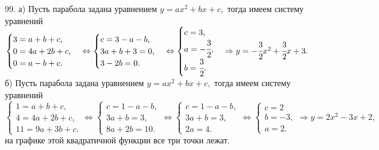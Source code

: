 99. а) Пусть парабола задана уравнением $y=ax^2+bx+c,$ тогда имеем систему уравнений\\ $\begin{cases} 3=a+b+c,\\ 0=4a+2b+c,\\ 0=a-b+c.\end{cases}
\Leftrightarrow \begin{cases} c=3-a-b,\\ 3a+b+3=0,\\ 3-2b=0.\end{cases}
\Leftrightarrow \begin{cases} c=3,\\ a=-\cfrac{3}{2},\\ b=\cfrac{3}{2}.\end{cases}\Rightarrow y=-\cfrac{3}{2}x^2+\cfrac{3}{2}x+3.$\\
б) Пусть парабола задана уравнением $y=ax^2+bx+c,$ тогда имеем систему уравнений\\ $\begin{cases} 1=a+b+c,\\ 4=4a+2b+c,\\ 11=9a+3b+c.\end{cases}
\Leftrightarrow \begin{cases} c=1-a-b,\\ 3a+b=3,\\ 8a+2b=10.\end{cases}
\Leftrightarrow \begin{cases} c=1-a-b,\\ 3a+b=3,\\ 2a=4.\end{cases}
\Leftrightarrow \begin{cases} c=2\\ b=-3,\\ a=2.\end{cases}
\Rightarrow y=2x^2-3x+2,$ на графике этой квадратичной функции все три точки лежат.\\
